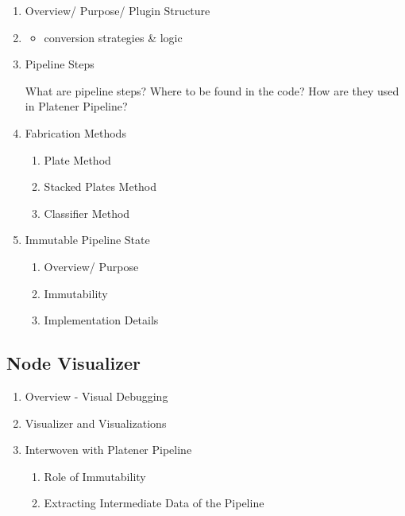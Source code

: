 \documentclass[../ClassicThesis.tex]{subfiles}
\begin{document}
\begin{enumerate}
\item Overview/ Purpose/ Plugin Structure

\item \begin{itemize}
\item conversion strategies & logic
\end{itemize}

\item Pipeline Steps

What are pipeline steps?
Where to be found in the code?
How are they used in Platener Pipeline?

\item Fabrication Methods


\begin{enumerate}
\item Plate Method


\item Stacked Plates Method


\item Classifier Method

\end{enumerate}

\item Immutable Pipeline State


\begin{enumerate}
\item Overview/ Purpose


\item Immutability


\item Implementation Details

\end{enumerate}
\end{enumerate}

\subsection{Node Visualizer}


\begin{enumerate}
\item Overview - Visual Debugging


\item Visualizer and Visualizations


\item Interwoven with Platener Pipeline


\begin{enumerate}
\item Role of Immutability


\item Extracting Intermediate Data of the Pipeline

\end{enumerate}
\end{enumerate}
\end{document}
